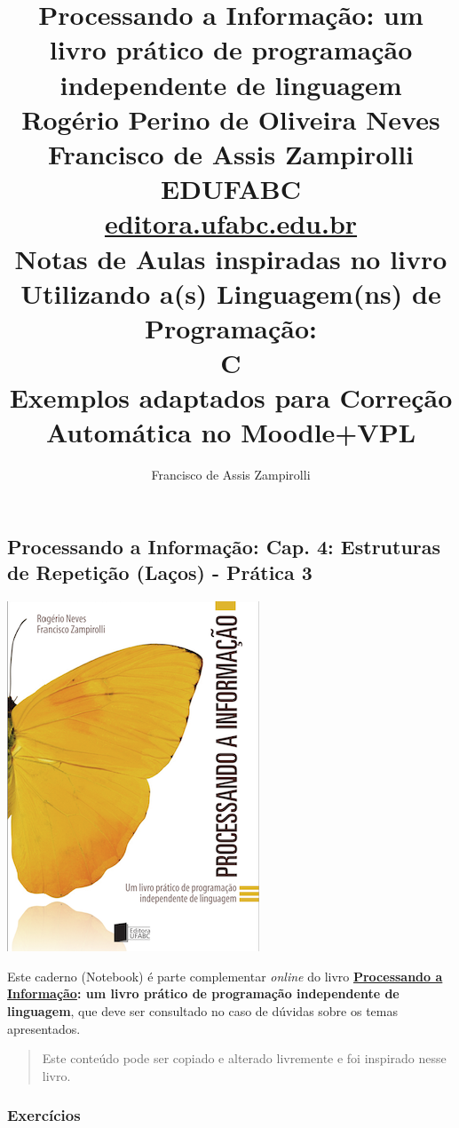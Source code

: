 \documentclass[12pt,a4paper]{article}
\title{Processando a Informação: um livro prático de programação independente de linguagem 
\\\large\vspace{2cm}
Rogério Perino de Oliveira Neves 
\\\vspace{5mm}
Francisco de Assis Zampirolli
\\\large\vspace{2cm}
EDUFABC
\\ \url{editora.ufabc.edu.br}
\\\Huge\vspace{3cm}
Notas de Aulas inspiradas no livro
\\\Large\vspace{1cm}
Utilizando a(s) Linguagem(ns) de Programação: 
\\\Huge\vspace{1cm}
C
\\\large\vspace{1cm}
Exemplos adaptados para Correção Automática no Moodle+VPL
\vspace{2cm}}
\author{Francisco de Assis Zampirolli\vspace{1cm}}
\begin{document}
    
    
\clearpage\maketitle
\thispagestyle{empty}
\tableofcontents

    
    

    
    \hypertarget{processando-a-informauxe7uxe3o-cap.-4-estruturas-de-repetiuxe7uxe3o-lauxe7os---pruxe1tica-3}{%
\subsection{Processando a Informação: Cap. 4: Estruturas de Repetição
(Laços) - Prática
3}\label{processando-a-informauxe7uxe3o-cap.-4-estruturas-de-repetiuxe7uxe3o-lauxe7os---pruxe1tica-3}}

    \includegraphics{"figs/Capa_Processando_Informacao.jpg"}

Este caderno (Notebook) é parte complementar \emph{online} do livro
\textbf{\href{https://editora.ufabc.edu.br/matematica-e-ciencias-da-computacao/58-processando-a-informacao}{Processando
a Informação}: um livro prático de programação independente de
linguagem}, que deve ser consultado no caso de dúvidas sobre os temas
apresentados.

\begin{quote}
Este conteúdo pode ser copiado e alterado livremente e foi inspirado
nesse livro.
\end{quote}

    \hypertarget{exercuxedcios}{%
\subsubsection{Exercícios}\label{exercuxedcios}}
\end{document}

